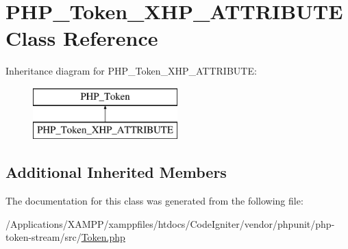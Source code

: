 \hypertarget{class_p_h_p___token___x_h_p___a_t_t_r_i_b_u_t_e}{}\section{P\+H\+P\+\_\+\+Token\+\_\+\+X\+H\+P\+\_\+\+A\+T\+T\+R\+I\+B\+U\+TE Class Reference}
\label{class_p_h_p___token___x_h_p___a_t_t_r_i_b_u_t_e}
Inheritance diagram for P\+H\+P\+\_\+\+Token\+\_\+\+X\+H\+P\+\_\+\+A\+T\+T\+R\+I\+B\+U\+TE\+:\begin{figure}[H]
\begin{center}
\leavevmode
\includegraphics[height=2.000000cm]{class_p_h_p___token___x_h_p___a_t_t_r_i_b_u_t_e}
\end{center}
\end{figure}
\subsection*{Additional Inherited Members}


The documentation for this class was generated from the following file\+:\begin{DoxyCompactItemize}
\item 
/\+Applications/\+X\+A\+M\+P\+P/xamppfiles/htdocs/\+Code\+Igniter/vendor/phpunit/php-\/token-\/stream/src/\mbox{\hyperlink{_token_8php}{Token.\+php}}\end{DoxyCompactItemize}
